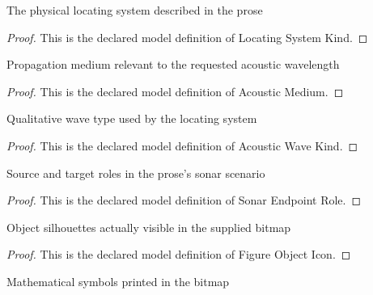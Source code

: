 \begin{definition}
  \label{def:physics:phyx-mini-0190:phyxminiproblems-problemphyxmini0190-locatingsystemkind}
  The physical locating system described in the prose
\end{definition}
\begin{proof}
  This is the declared model definition of Locating System Kind.
\end{proof}
\begin{definition}
  \label{def:physics:phyx-mini-0190:phyxminiproblems-problemphyxmini0190-acousticmedium}
  Propagation medium relevant to the requested acoustic wavelength
\end{definition}
\begin{proof}
  This is the declared model definition of Acoustic Medium.
\end{proof}
\begin{definition}
  \label{def:physics:phyx-mini-0190:phyxminiproblems-problemphyxmini0190-acousticwavekind}
  Qualitative wave type used by the locating system
\end{definition}
\begin{proof}
  This is the declared model definition of Acoustic Wave Kind.
\end{proof}
\begin{definition}
  \label{def:physics:phyx-mini-0190:phyxminiproblems-problemphyxmini0190-sonarendpointrole}
  Source and target roles in the prose's sonar scenario
\end{definition}
\begin{proof}
  This is the declared model definition of Sonar Endpoint Role.
\end{proof}
\begin{definition}
  \label{def:physics:phyx-mini-0190:phyxminiproblems-problemphyxmini0190-figureobjecticon}
  Object silhouettes actually visible in the supplied bitmap
\end{definition}
\begin{proof}
  This is the declared model definition of Figure Object Icon.
\end{proof}
\begin{definition}
  \label{def:physics:phyx-mini-0190:phyxminiproblems-problemphyxmini0190-figurequantitylabel}
  Mathematical symbols printed in the bitmap
\end{definition}

